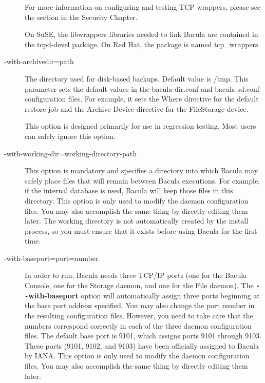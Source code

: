 \begin{description}
   For more information on configuring and testing TCP wrappers, please  see the 
     section
   in the Security Chapter.  

   On SuSE, the libwrappers libraries needed to link Bacula are
   contained in the tcpd-devel package. On Red Hat, the package is named
   tcp\_wrappers.

\item [ {-}{\-}with-archivedir=\lt{}path\gt{} ]
   The directory used for disk-based backups.  Default value is /tmp.
   This parameter sets the default values in the bacula-dir.conf and bacula-sd.conf
   configuration files.  For example, it sets the Where directive for the
   default restore job and the Archive Device directive for the FileStorage
   device.

   This option is designed primarily for use in regression testing.
   Most users can safely ignore this option.

\item [ {-}{\-}with-working-dir=\lt{}working-directory-path\gt{} ]
   This option is mandatory and specifies a directory  into which Bacula may
   safely place files that  will remain between Bacula executions. For example, 
   if the internal database is used, Bacula will keep  those files in this
   directory.  This option is only used to modify the daemon  configuration
   files. You may also accomplish the same  thing by directly editing them later.
   The working directory  is not automatically created by the install process, so
   you  must ensure that it exists before using Bacula for the  first time. 

\item [ {-}{\-}with-baseport=\lt{}port=number\gt{}]
   In order to run,  Bacula needs three TCP/IP ports (one for the Bacula 
   Console, one for the Storage daemon, and one for the File daemon).  The {\bf
   \verb:--:with-baseport} option will automatically assign three  ports beginning at
   the base port address specified. You may  also change the port number in the
   resulting configuration  files. However, you need to take care that the
   numbers  correspond correctly in each of the three daemon configuration 
   files. The default base port is 9101, which assigns ports 9101  through 9103.
   These ports (9101, 9102, and 9103) have been  officially assigned to Bacula by
   IANA.  This option is only used  to modify the daemon configuration files. You
   may also accomplish  the same thing by directly editing them later. 


\end{description}

